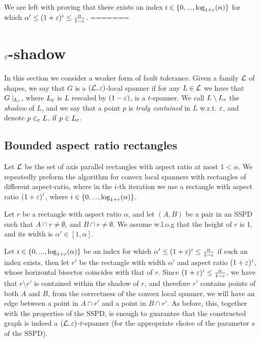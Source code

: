 \documentclass[12pt]{article}%
\begin{document}
We are left with proving that there exists an index
$i\in \{0,...,\log_{1+\varepsilon}(\alpha)\}$ for which
$\alpha' \leq (1+\varepsilon)^i \leq \frac{\alpha}{1-\varepsilon}$.
=======

	\section{$\varepsilon$-shadow}
In this section we consider a weaker form of fault tolerance. Given a family $\mathcal{L}$ of shapes, we say that $G$ is a $(\mathcal{L},\varepsilon)$-local spanner if for any $L\in\mathcal{L}$ we have that $G\mid_{L_{\varepsilon}}$, where $L_{\varepsilon}$ is $L$ rescaled by $(1-\varepsilon)$, is a $t$-spanner. We call $L\setminus L_{\varepsilon}$ the \emph{shadow} of $L$, and we say that a point $p$ is \emph{truly contained} in $L$ w.r.t. $\varepsilon$, and denote $p\in_{\varepsilon} L$, if $p\in L_{\varepsilon}$. 

\subsection{Bounded aspect ratio rectangles}
Let $\mathcal{L}$ be the set of axis parallel rectangles with aspect ratio at most $1<\alpha$. We repeatedly preform the algorithm for convex local spanners with rectangles of different aspect-ratio, where in the $i$-th iteration we use a rectangle with aspect ratio $\left(1+\varepsilon\right)^i$, where $i\in\{0,...,\log_{1+\varepsilon}(\alpha)\}$. 

Let $r$ be a rectangle with aspect ratio $\alpha$, and let $(A,B)$ be a pair in an SSPD such that $A\cap r\neq \emptyset$, and $B\cap r\neq \emptyset$. We assume w.l.o.g that the height of $r$ is 1, and its width is $\alpha'\in [1,\alpha]$.

Let $i\in \{0,...,\log_{1+\varepsilon}(\alpha)\}$ be an index for which $\alpha' \leq (1+\varepsilon)^i \leq \frac{\alpha}{1-\varepsilon}$ if such an index exists, then let $r'$ be the rectangle with width $\alpha'$ and aspect ratio $(1+\varepsilon)^i$, whose horizontal bisector coincides with that of $r$. Since $(1+\varepsilon)^i \leq \frac{\alpha}{1-\varepsilon}$, we have that $r\setminus r'$ is contained within the shadow of $r$, and therefore $r'$ contains points of both $A$ and $B$, from the correctness of the convex local spanner, we will have an edge between a point in $A\cap r'$ and a point in $B\cap r'$. As before, this, together with the properties of the SSPD, is enough to guarantee that the constructed graph is indeed a $(\mathcal{L}, \varepsilon)$-$t$-spanner (for the appropriate choice of the parameter $s$ of the SSPD).
\end{document}
